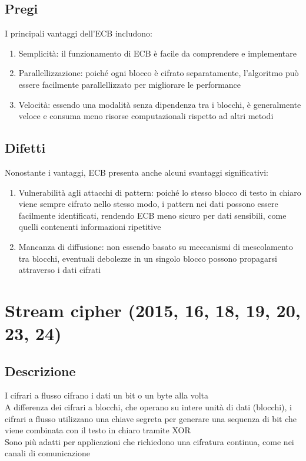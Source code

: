\documentclass[10pt,oneside,a4paper]{article}
\begin{document}
\subsection{Pregi}
I principali vantaggi dell'ECB includono:
\begin{enumerate}
\item Semplicità: il funzionamento di ECB è facile da comprendere e implementare
\item Parallellizzazione: poiché ogni blocco è cifrato separatamente, l'algoritmo può essere facilmente parallellizzato per migliorare le performance
\item Velocità: essendo una modalità senza dipendenza tra i blocchi, è generalmente veloce e consuma meno risorse computazionali rispetto ad altri metodi
\end{enumerate}
\subsection{Difetti}
Nonostante i vantaggi, ECB presenta anche alcuni svantaggi significativi:
\begin{enumerate}
\item Vulnerabilità agli attacchi di pattern: poiché lo stesso blocco di testo in chiaro viene sempre cifrato nello stesso modo, i pattern nei dati possono essere facilmente identificati, rendendo ECB meno sicuro per dati sensibili, come quelli contenenti informazioni ripetitive
\item Mancanza di diffusione: non essendo basato su meccanismi di mescolamento tra blocchi, eventuali debolezze in un singolo blocco possono propagarsi attraverso i dati cifrati
\end{enumerate}
\section{Stream cipher (2015, 16, 18, 19, 20, 23, 24)}
\subsection{Descrizione}
I cifrari a flusso cifrano i dati un bit o un byte alla volta\\
A differenza dei cifrari a blocchi, che operano su intere unità di dati (blocchi), i cifrari a flusso utilizzano una chiave segreta per generare una sequenza di bit che viene combinata con il testo in chiaro tramite XOR\\
Sono più adatti per applicazioni che richiedono una cifratura continua, come nei canali di comunicazione
\end{document}
